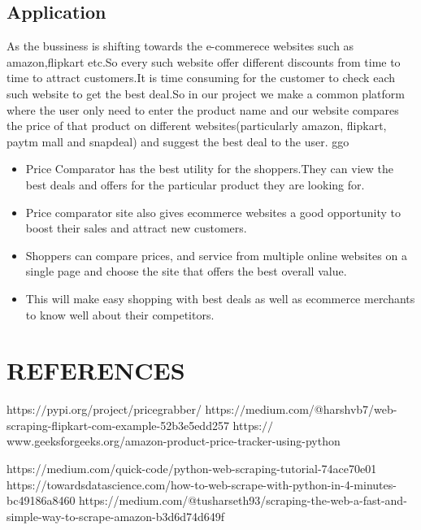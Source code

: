 \documentclass[11pt]{article}
\begin{document}
\subsection{\Large{Application}}
As the bussiness is shifting towards the e-commerece websites such as amazon,flipkart etc.So every such website offer different discounts from time to time to attract customers.It is time consuming for the customer to check each such website to get the best deal.So in our project we make a common platform where the user only need to enter the product name and our website compares the price of that product on different websites(particularly amazon, flipkart, paytm mall and snapdeal) and suggest the best deal to the user.   ggo
\begin{itemize}
\renewcommand\labelitemi{\large$\bullet$}
    \item Price Comparator has the best utility for the shoppers.They can view the best deals and offers for the particular product they are looking for.
    \item Price comparator site also gives ecommerce websites a good opportunity to boost their sales and  attract new customers.
\item  Shoppers can compare prices, and service from multiple online websites on a single page and choose the site that offers the best overall value.
\item This will make easy shopping with best deals as well as ecommerce merchants to know well about their competitors.
\end{itemize}


\section{\LARGE{REFERENCES}}
\begin{thebibliography}{9}
https:$//$pypi.org/project/pricegrabber/
https:$//$medium.com/@harshvb7/web-scraping-flipkart-com-example-52b3e5edd257
https:$//$www.geeksforgeeks.org/amazon-product-price-tracker-using-python

\bibitem{}
https://medium.com/quick-code/python-web-scraping-tutorial-74ace70e01
\bibitem{}
https://towardsdatascience.com/how-to-web-scrape-with-python-in-4-minutes-bc49186a8460
\bibitem{}
https://medium.com/@tusharseth93/scraping-the-web-a-fast-and-simple-way-to-scrape-amazon-b3d6d74d649f
\end{thebibliography}
\end{document}
